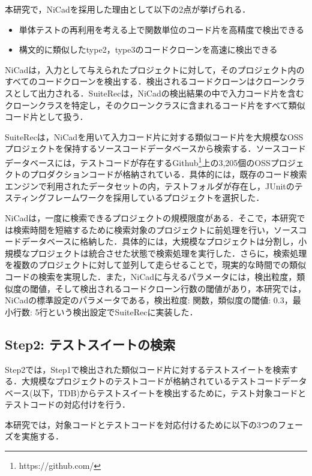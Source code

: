 \documentclass[12pt]{jarticle} %
\begin{document}
本研究で，{\sf NiCad}を採用した理由として以下の2点が挙げられる．

\begin{itemize}
\item 単体テストの再利用を考える上で関数単位のコード片を高精度で検出できる
\item 構文的に類似したtype2，type3のコードクローンを高速に検出できる
\end{itemize}


{\sf NiCad}は，入力として与えられたプロジェクトに対して，そのプロジェクト内のすべてのコードクローンを検出する．検出されるコードクローンはクローンクラスとして出力される．{\sf SuiteRec}は，{\sf NiCad}の検出結果の中で入力コード片を含むクローンクラスを特定し，そのクローンクラスに含まれるコード片をすべて類似コード片として扱う．

{\sf SuiteRec}は，{\sf NiCad}を用いて入力コード片に対する類似コード片を大規模なOSSプロジェクトを保持するソースコードデータベースから検索する．ソースコードデータベースには，テストコードが存在するGithub\footnote{https://github.com/}上の3,205個のOSSプロジェクトのプロダクションコードが格納されている．具体的には，既存のコード検索エンジンで利用されたデータセット\cite{FaCoY}の内，テストフォルダが存在し，JUnitのテスティングフレームワークを採用しているプロジェクトを選択した．

{\sf NiCad}は，一度に検索できるプロジェクトの規模限度がある．そこで，本研究では検索時間を短縮するために検索対象のプロジェクトに前処理を行い，ソースコードデータベースに格納した．具体的には，大規模なプロジェクトは分割し，小規模なプロジェクトは統合させた状態で検索処理を実行した．さらに，検索処理を複数のプロジェクトに対して並列して走らせることで，現実的な時間での類似コードの検索を実現した．また，{\sf NiCad}に与えるパラメータには，検出粒度，類似度の閾値，そして検出されるコードクローン行数の閾値があり，本研究では，{\sf NiCad}の標準設定のパラメータである，検出粒度: 関数，類似度の閾値: 0.3，最小行数: 5行という検出設定で{\sf SuiteRec}に実装した．

\subsection{Step2: テストスイートの検索}
Step2では，Step1で検出された類似コード片に対するテストスイートを検索する．大規模なプロジェクトのテストコードが格納されているテストコードデータベース(以下，TDB)からテストスイートを検出するために，テスト対象コードとテストコードの対応付けを行う．

本研究では，対象コードとテストコードを対応付けるために以下の3つのフェーズを実施する．
\end{document}
